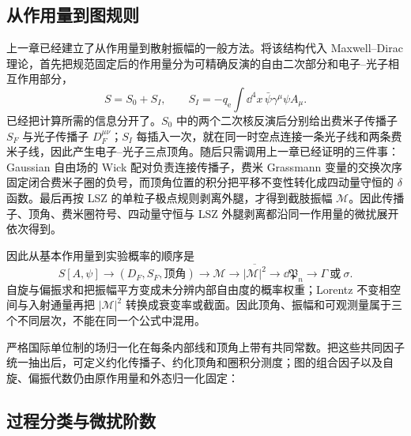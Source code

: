 \subsection{从作用量到图规则}

上一章已经建立了从作用量到散射振幅的一般方法。将该结构代入 Maxwell--Dirac 理论，首先把规范固定后的作用量分为可精确反演的自由二次部分和电子--光子相互作用部分，
\begin{equation}
 S=S_0+S_I,
 \qquad
 S_I=-q_{\mathrm e}\int\dd^4 x\,\bar\psi\gamma^\mu\psi A_\mu.
 \label{eq:qed-action-to-diagram-mainline-dp7}
\end{equation}
 已经把计算所需的信息分开了。$S_0$ 中的两个二次核反演后分别给出费米子传播子 $S_F$ 与光子传播子 $D_F^{\mu\nu}$；$S_I$ 每插入一次，就在同一时空点连接一条光子线和两条费米子线，因此产生电子--光子三点顶角。随后只需调用上一章已经证明的三件事：Gaussian 自由场的 Wick 配对负责连接传播子，费米 Grassmann 变量的交换次序固定闭合费米子圈的负号，而顶角位置的积分把平移不变性转化成四动量守恒的 $\delta$ 函数。最后再按 LSZ 的单粒子极点规则剥离外腿，才得到截肢振幅 $\mathcal M$。因此传播子、顶角、费米圈符号、四动量守恒与 LSZ 外腿剥离都沿同一作用量的微扰展开依次得到。

因此从基本作用量到实验概率的顺序是
\begin{equation}
 \boxed{
 S[A,\psi]
 \longrightarrow
 (D_F,S_F,\text{顶角})
 \longrightarrow
 \mathcal M
 \longrightarrow
 \overline{|\mathcal M|^2}
 \longrightarrow
 \dd\mathfrak P_n
 \longrightarrow
 \Gamma\ \text{或}\ \sigma .}
 \label{eq:qed-calculation-chain-dp7}
\end{equation}
自旋与偏振求和把振幅平方变成未分辨内部自由度的概率权重；Lorentz 不变相空间与入射通量再把 $|\mathcal M|^2$ 转换成衰变率或截面。因此顶角、振幅和可观测量属于三个不同层次，不能在同一个公式中混用。

严格国际单位制的场归一化在每条内部线和顶角上带有共同常数。把这些共同因子统一抽出后，可定义约化传播子、约化顶角和圈积分测度；图的组合因子以及自旋、偏振代数仍由原作用量和外态归一化固定：








\subsection{过程分类与微扰阶数}


